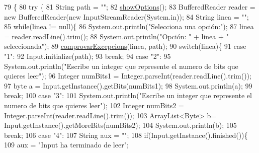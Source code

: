 \begin{DoxyCode}
79                                            \{
80         \textcolor{keywordflow}{try} \{
81             String path = \textcolor{stringliteral}{""};
82             \hyperlink{classpersistencia_1_1input_1_1Driver____Input_a4f8a0f13847071d675771817ee212f2c}{showOptions}();
83             BufferedReader reader = \textcolor{keyword}{new} BufferedReader(\textcolor{keyword}{new} InputStreamReader(System.in));
84             String linea = \textcolor{stringliteral}{""};
85             \textcolor{keywordflow}{while}(linea != null)\{
86                 System.out.println(\textcolor{stringliteral}{"Selecciona una opción:"});
87                 linea = reader.readLine().trim();
88                 System.out.println(\textcolor{stringliteral}{"Opción: "} + linea + \textcolor{stringliteral}{" seleccionada"});
89                 \hyperlink{classpersistencia_1_1input_1_1Driver____Input_a0d86ebc99984018efe2b52c6f97de708}{comprovarExcepcions}(linea, path);
90                 \textcolor{keywordflow}{switch}(linea)\{
91                     \textcolor{keywordflow}{case} \textcolor{stringliteral}{"1"}:
92                         Input.initialize(path);
93                     \textcolor{keywordflow}{break};
94                     \textcolor{keywordflow}{case} \textcolor{stringliteral}{"2"}:
95                         System.out.println(\textcolor{stringliteral}{"Escribe un integer que represente el numero de bits que quieres
       leer"});
96                         Integer numBits1 = Integer.parseInt(reader.readLine().trim());
97                         byte a = Input.getInstance().getBits(numBits1);
98                         System.out.println(a);
99                     \textcolor{keywordflow}{break};
100                     \textcolor{keywordflow}{case} \textcolor{stringliteral}{"3"}:
101                         System.out.println(\textcolor{stringliteral}{"Escribe un integer que represente el numero de bits que quieres
       leer"});
102                         Integer numBits2 = Integer.parseInt(reader.readLine().trim());
103                         ArrayList<Byte> b= Input.getInstance().getMoreBits(numBits2);
104                         System.out.println(b);
105                     \textcolor{keywordflow}{break};
106                     \textcolor{keywordflow}{case} \textcolor{stringliteral}{"4"}:
107                         String aux = \textcolor{stringliteral}{""};
108                         \textcolor{keywordflow}{if}(Input.getInstance().finished())\{
109                             aux = \textcolor{stringliteral}{"Input ha terminado de leer"};

\end{DoxyCode}
